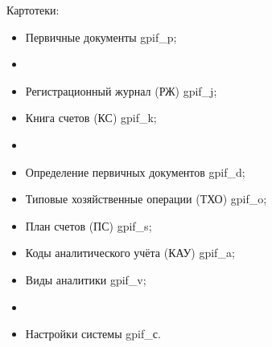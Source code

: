 Картотеки:

\begin{itemize}
    \item Первичные документы gpif\_p;
    \item[]\hspace{0pt}
    \item Регистрационный журнал (РЖ) gpif\_j;
    \item Книга счетов (КС) gpif\_k;
    \item[]\hspace{0pt}
    \item Определение первичных документов gpif\_d;
    \item Типовые хозяйственные операции (ТХО) gpif\_o;
    \item План счетов (ПС) gpif\_s;
    \item Коды аналитического учёта (КАУ) gpif\_a;
    \item Виды аналитики gpif\_v;
    \item[]\hspace{0pt}
    \item Настройки системы gpif\_с. 
\end{itemize}

